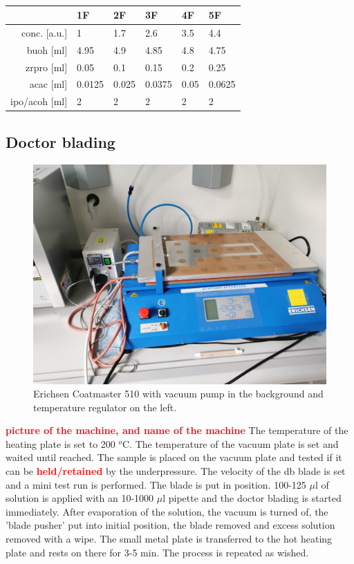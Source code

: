 \documentclass[a4paper]{article}
\newcommand{\td}[1]{\textbf{\textcolor{red}{#1}}}
\begin{document}
\begin{table}[h]
	\centering
	\caption{}
	\label{tab:rec2}
	\begin{tabular}{rlllll}
		\hline
				&1F		&2F		&3F		&4F		&5F		\\
		\hline
		conc. [a.u.]	&1		&1.7	&2.6	&3.5	&4.4	\\
		\hline
		\gls{buoh} [ml]		&4.95	&4.9	&4.85	&4.8	&4.75	\\
		\gls{zrpro} [ml]	&0.05	&0.1	&0.15	&0.2	&0.25	\\
		\gls{acac} [ml]		&0.0125	&0.025	&0.0375	&0.05	&0.0625	\\
		\gls{ipo}/\gls{acoh} [ml]		&2		&2		&2		&2		&2		\\
		\hline
	\end{tabular}
\end{table}

\subsection{Doctor blading}
\label{sec:DB}
\begin{figure}
	\centering
	\includegraphics[width=.8\textwidth]{Pics/erichsen.png}
	\caption{Erichsen Coatmaster 510 
		with vacuum pump in the background and temperature regulator on the left.}
	\label{fig:eric}
\end{figure}
\td{picture of the machine, and name of the machine}
The temperature of the heating plate is set to 200 $^o$C.
The temperature of the vacuum plate is set and waited until reached.
The sample is placed on the vacuum plate and tested if it can be \td{held/retained} by the underpressure.
The velocity of the \gls{db} blade is set and a mini test run is performed. 
The blade is put in position. 
100-125 $\mu$l of solution is applied with an 10-1000 $\mu$l pipette and the doctor blading is started immediately. 
After evaporation of the solution, the vacuum is turned of, the 'blade pusher' put into initial position, the blade removed and excess solution removed with a wipe. 
The small metal plate is transferred to the hot heating plate and rests on there for 3-5 min. 
The process is repeated as wished. 
\end{document}
